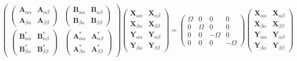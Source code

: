 \begin{equation}
    \begin{pmatrix}
\begin{pmatrix}
    \mathbf{A}_{\alpha \alpha } & \mathbf{A}_{\alpha \beta } \\
    \mathbf{A}_{\beta \alpha } & \mathbf{A}_{\beta \beta }
\end{pmatrix}
&
\begin{pmatrix}
    \mathbf{B}_{\alpha \alpha } & \mathbf{B}_{\alpha \beta } \\
    \mathbf{B}_{\beta \alpha } & \mathbf{B}_{\beta \beta }
\end{pmatrix}
\\
\begin{pmatrix}
    \mathbf{B}_{\alpha \alpha }^{*} & \mathbf{B}_{\alpha \beta }^{*} \\
    \mathbf{B}_{\beta \alpha }^{*} & \mathbf{B}_{\beta \beta }^{*}
\end{pmatrix}
&
\begin{pmatrix}
    \mathbf{A}_{\alpha \alpha }^{*} & \mathbf{A}_{\alpha \beta }^{*} \\
    \mathbf{A}_{\beta \alpha }^{*} & \mathbf{A}_{\beta \beta }^{*}
\end{pmatrix}
\end{pmatrix}
    \begin{pmatrix}
        \mathbf{X}_{\alpha\alpha} & \mathbf{X}_{\alpha\beta}\\
        \mathbf{X}_{\beta\alpha} & \mathbf{X}_{\beta\beta}\\
        \mathbf{Y}_{\alpha\alpha} & \mathbf{Y}_{\alpha\beta}\\
        \mathbf{Y}_{\beta\alpha} & \mathbf{Y}_{\beta\beta}
    \end{pmatrix}
    =
    \begin{pmatrix}
        \Omega & 0 & 0 & 0\\
        0 & \Omega & 0 & 0\\
        0 & 0 & -\Omega & 0\\
        0 & 0 & 0 & -\Omega
    \end{pmatrix}
    \begin{pmatrix}
        \mathbf{X}_{\alpha\alpha} & \mathbf{X}_{\alpha\beta}\\
        \mathbf{X}_{\beta\alpha} & \mathbf{X}_{\beta\beta}\\
        \mathbf{Y}_{\alpha\alpha} & \mathbf{Y}_{\alpha\beta}\\
        \mathbf{Y}_{\beta\alpha} & \mathbf{Y}_{\beta\beta}
    \end{pmatrix}
\end{equation}
